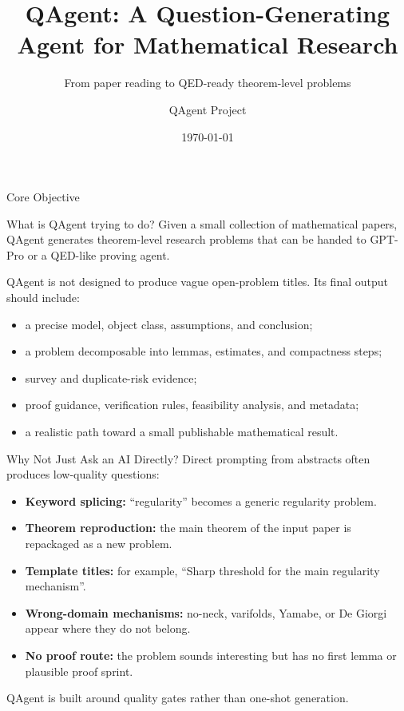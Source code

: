 \documentclass[aspectratio=169,11pt]{beamer}
\title[QAgent]{QAgent: A Question-Generating Agent for Mathematical Research}
\subtitle{From paper reading to QED-ready theorem-level problems}
\author{QAgent Project}
\date{\today}
\begin{document}
\begin{frame}
  \titlepage
\end{frame}

\begin{frame}{Core Objective}
  \begin{block}{What is QAgent trying to do?}
    Given a small collection of mathematical papers, QAgent generates theorem-level research problems that can be handed to GPT-Pro or a QED-like proving agent.
  \end{block}

  \vspace{0.4em}
  QAgent is not designed to produce vague open-problem titles. Its final output should include:
  \begin{itemize}
    \item a precise model, object class, assumptions, and conclusion;
    \item a problem decomposable into lemmas, estimates, and compactness steps;
    \item survey and duplicate-risk evidence;
    \item proof guidance, verification rules, feasibility analysis, and metadata;
    \item a realistic path toward a small publishable mathematical result.
  \end{itemize}
\end{frame}

\begin{frame}{Why Not Just Ask an AI Directly?}
  Direct prompting from abstracts often produces low-quality questions:
  \begin{itemize}
    \item \textbf{Keyword splicing:} ``regularity'' becomes a generic regularity problem.
    \item \textbf{Theorem reproduction:} the main theorem of the input paper is repackaged as a new problem.
    \item \textbf{Template titles:} for example, ``Sharp threshold for the main regularity mechanism''.
    \item \textbf{Wrong-domain mechanisms:} no-neck, varifolds, Yamabe, or De Giorgi appear where they do not belong.
    \item \textbf{No proof route:} the problem sounds interesting but has no first lemma or plausible proof sprint.
  \end{itemize}

  \vspace{0.4em}
  QAgent is built around quality gates rather than one-shot generation.
\end{frame}
\end{document}
